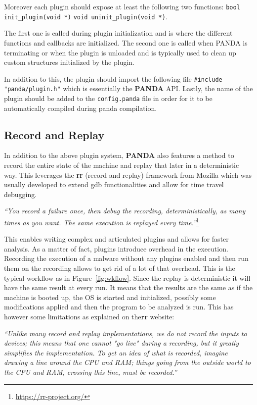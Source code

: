 Moreover each plugin should expose at least the following two functions: \lstinline{bool init_plugin(void *)} \lstinline{void uninit_plugin(void *)}.

The first one is called during plugin initialization and is where the different functions and callbacks are initialized. The second one is called when PANDA is terminating or when the plugin is unloaded and is typically used to clean up custom structures initialized by the plugin.

In addition to this, the plugin should import the following file \lstinline{#include "panda/plugin.h"} which is essentially the \textbf{PANDA} API. Lastly, the name of the plugin should be added to the \lstinline{config.panda} file in order for it to be automatically compiled during panda compilation.


\subsection{Record and Replay}

In addition to the above plugin system, \textbf{PANDA} also features a method to record the entire state of the machine and replay that later in a deterministic way. This leverages the \textbf{rr} (record and replay) framework from Mozilla which was usually developed to extend gdb functionalities and allow for time travel debugging. 

\textit{``You record a failure once, then debug the recording, deterministically, as many times as you want. The same execution is replayed every time.''}\footnote{\url{https://rr-project.org/}}

This enables writing complex and articulated plugins and allows for faster analysis. As a matter of fact, plugins introduce overhead in the execution. Recording the execution of a malware without any plugins enabled and then run them on the recording allows to get rid of a lot of that overhead. This is the typical workflow as in Figure~\ref{fig:wkflow}. Since the replay is deterministic it will have the same result at every run. It means that the results are the same as if the machine is booted up, the OS is started and initialized, possibly some modifications applied and then the program to be analyzed is run. This has however some limitations as explained on the\textbf{rr} website: 

\textit{``Unlike many record and replay implementations, we do not record the inputs to devices; this means that one cannot "go live" during a recording, but it greatly simplifies the implementation. To get an idea of what is recorded, imagine drawing a line around the CPU and RAM; things going from the outside world to the CPU and RAM, crossing this line, must be recorded.''}

